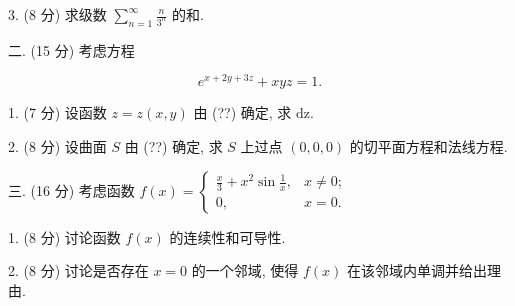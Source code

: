 \documentclass{examcollection}
\renewcommand{\displayformula}[1]{\[#1\]}
\begin{document}
{\begin{minipage}{\textwidth}
3. (8 分) 求级数 $\sum_{n=1}^{\infty} \frac{n}{3^n}$ 的和.\par
二. (15 分) 考虑方程\par
\displayformula{e ^ {x + 2 y + 3 z} + x y z = 1.}\par
1. (7 分) 设函数 $z = z(x, y)$ 由 (??) 确定, 求 $\mathrm{dz}$.\par
2. (8 分) 设曲面 $S$ 由 (??) 确定, 求 $S$ 上过点 $(0,0,0)$ 的切平面方程和法线方程.\par
三. (16 分) 考虑函数 $f(x) = \begin{cases} \frac{x}{3} + x^2 \sin \frac{1}{x}, & x \neq 0; \\ 0, & x = 0. \end{cases}$\par
1. (8 分) 讨论函数 $f(x)$ 的连续性和可导性.\par
2. (8 分) 讨论是否存在 $x = 0$ 的一个邻域, 使得 $f(x)$ 在该邻域内单调并给出理由.\par
\end{minipage}}
\ifdim\dimexpr\ht\proofbox+\dp\proofbox\relax>\textheight
\noindent\resizebox{!}{\textheight}{\usebox{\proofbox}}\else\noindent\usebox{\proofbox}\fi\clearpage
\end{document}
